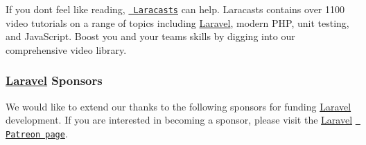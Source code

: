 If you don\textquotesingle{}t feel like reading, \href{https://laracasts.com}{\texttt{ Laracasts}} can help. Laracasts contains over 1100 video tutorials on a range of topics including \mbox{\hyperlink{a00008}{Laravel}}, modern P\+HP, unit testing, and Java\+Script. Boost you and your team\textquotesingle{}s skills by digging into our comprehensive video library.

\subsubsection*{\mbox{\hyperlink{a00008}{Laravel}} Sponsors}

We would like to extend our thanks to the following sponsors for funding \mbox{\hyperlink{a00008}{Laravel}} development. If you are interested in becoming a sponsor, please visit the \mbox{\hyperlink{a00008}{Laravel}} \href{https://patreon.com/taylorotwell}{\texttt{ Patreon page}}.


